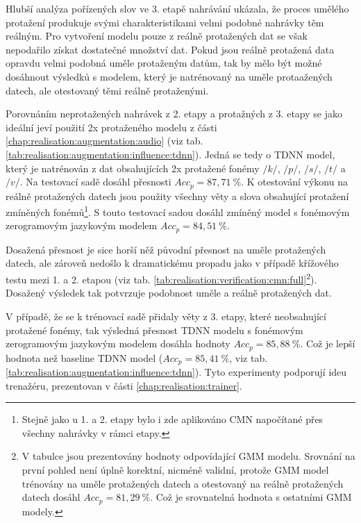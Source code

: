 Hlubší analýza pořízených slov ve 3. etapě nahrávání ukázala, že proces umělého protažení produkuje svými charakteristikami velmi podobné nahrávky těm reálným. Pro vytvoření modelu pouze z reálně protažených dat se však nepodařilo získat dostatečné množství dat. Pokud jsou reálně protažená data opravdu velmi podobná uměle protaženým datům, tak by mělo být možné dosáhnout  výsledků s modelem, který je natrénovaný na uměle protaažených datech, ale otestovaný těmi reálně protaženými.

Porovnáním neprotažených nahrávek z 2. etapy a protažných z 3. etapy se jako ideální jeví použití 2x protaženého modelu z části \ref{chap:realisation:augmentation:audio} (viz tab. \ref{tab:realisation:augmentation:influence:tdnn}). Jedná se tedy o TDNN model, který je natrénován z dat obsahujících 2x protažené fonémy $/k/$, $/p/$, $/s/$, $/t/$ a $/v/$.  Na testovací sadě dosáhl přesnosti $Acc_{p} = 87,71\ \%$. K otestování výkonu na reálně protažených datech jsou použity všechny věty a slova obsahující protažení zmíněných fonémů\footnote{Stejně jako u 1. a 2. etapy bylo i zde aplikováno CMN napočítané přes všechny nahrávky v rámci etapy.}. S touto testovací sadou dosáhl zmíněný model s fonémovým zerogramovým jazykovým modelem $Acc_{p} = 84,51\ \%$.

Dosažená přesnost je sice horší něž původní přesnost na uměle protažených datech, ale zároveň nedošlo k dramatickému propadu jako v případě křížového testu mezi 1. a 2. etapou (viz tab. \ref{tab:realisation:verification:cmn:full}\footnote{V tabulce jsou prezentovány hodnoty odpovídající GMM modelu. Srovnání na první pohled není úplně korektní, nicméně validní, protože GMM model trénovány na uměle protažených datech a otestovaný na reálně protažených datech dosáhl $Acc_{p} = 81,29\ \%$. Což je srovnatelná hodnota s ostatními GMM modely.}). Dosažený výsledek tak potvrzuje podobnost uměle a reálně protažených dat.

V případě, že se k trénovací sadě přidaly věty z 3. etapy, které neobsahující protažené fonémy, tak výsledná přesnost TDNN modelu s fonémovým zerogramovým jazykovým modelem dosáhla hodnoty $Acc_{p} = 85,88\ \%$. Což je lepší hodnota než baseline TDNN model ($Acc_{p} = 85,41\ \%$, viz tab. \ref{tab:realisation:augmentation:influence:tdnn}). Tyto experimenty podporují ideu trenažéru, prezentovan v části \ref{chap:realisation:trainer}.
